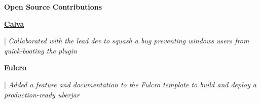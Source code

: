 \documentclass[letterpaper,11pt]{article}
\begin{document}
\textbf{\large \textcolor{magic_blue}{Open Source Contributions}}

\begin{minipage}[t]{0.08\textwidth}
  \raggedright
  \href{https://github.com/BetterThanTomorrow/calva/issues/2325}{ \underline{\textbf{Calva}}} \\
\end{minipage}
\hfill
\begin{minipage}[t]{0.90\textwidth}
  \raggedright
  |\textit{ Collaborated with the lead dev to squash a bug preventing windows users from quick-booting the plugin } \\
\end{minipage}

\begin{minipage}[t]{0.08\textwidth}
  \raggedright
  \href{https://github.com/fulcrologic/fulcro-template/pull/28}{ \underline{\textbf{Fulcro}}} \\
\end{minipage}
\hfill
\begin{minipage}[t]{0.90\textwidth}
  \raggedright
  |\textit{ Added a feature and documentation to the Fulcro template to build and deploy a production-ready uberjar } \\
\end{minipage}
\end{document}
